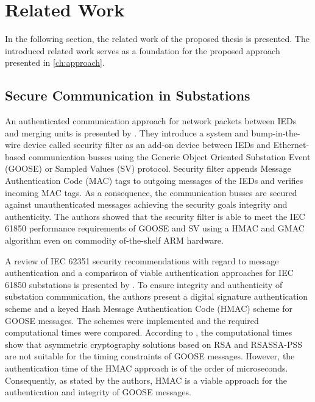 \chapter{Related Work}
\label{ch:relatedwork}
In the following section, the related work of the proposed thesis is presented.
The introduced related work serves as a foundation for the proposed approach presented in \autoref{ch:approach}.

\section{Secure Communication in Substations}
An authenticated communication approach for network packets between IEDs and merging units is presented by \citeauthor{Ishchenko2018} \cite{Ishchenko2018}.
They introduce a system and bump-in-the-wire device called security filter as an add-on device between IEDs and Ethernet-based communication busses using the Generic Object Oriented Substation Event (GOOSE) or Sampled Values (SV) protocol.
Security filter appends Message Authentication Code (MAC) tags to outgoing messages of the IEDs and verifies incoming MAC tags.
As a consequence, the communication busses are secured against unauthenticated messages achieving the security goals integrity and authenticity.
The authors showed that the security filter is able to meet the IEC 61850 performance requirements of GOOSE and SV \cite{IEC61850P5} using a HMAC and GMAC algorithm even on commodity of-the-shelf ARM hardware.

A review of IEC 62351 security recommendations with regard to message authentication and a comparison of viable authentication approaches for IEC 61850 substations is presented by \citeauthor{Elbez2019} \cite{Elbez2019}.
To ensure integrity and authenticity of substation communication, the authors present a digital signature authentication scheme and a keyed Hash Message Authentication Code (HMAC) scheme for GOOSE messages.
The schemes were implemented and the required computational times were compared.
According to \citeauthor{Elbez2019}, the computational times show that asymmetric cryptography solutions based on RSA and RSASSA-PSS are not suitable for the timing constraints of GOOSE messages.
However, the authentication time of the HMAC approach is of the order of microseconds.
Consequently, as stated by the authors, HMAC is a viable approach for the authentication and integrity of GOOSE messages.

